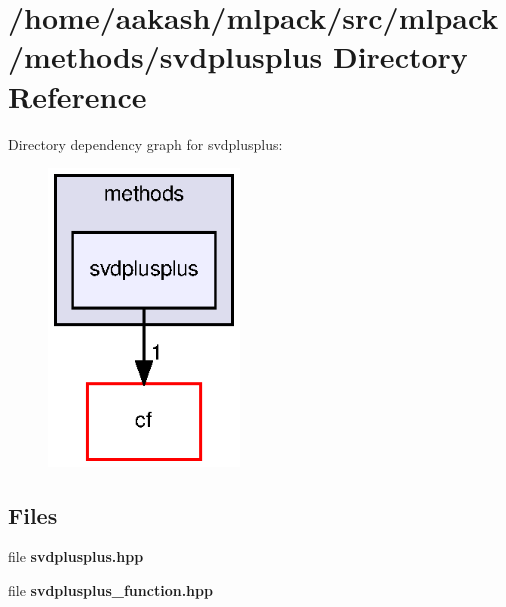 \section{/home/aakash/mlpack/src/mlpack/methods/svdplusplus Directory Reference}
\label{dir_8615cbd7f19b1235f5aa609b414bff06}
Directory dependency graph for svdplusplus\+:
\nopagebreak
\begin{figure}[H]
\begin{center}
\leavevmode
\includegraphics[width=144pt]{dir_8615cbd7f19b1235f5aa609b414bff06_dep}
\end{center}
\end{figure}
\subsection*{Files}
\begin{DoxyCompactItemize}
\item 
file \textbf{ svdplusplus.\+hpp}
\item 
file \textbf{ svdplusplus\+\_\+function.\+hpp}
\end{DoxyCompactItemize}
